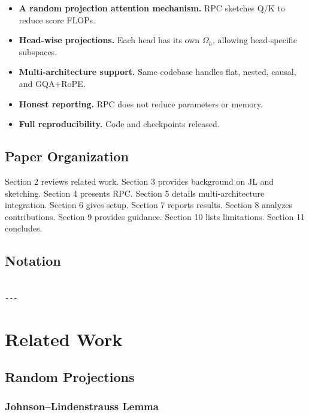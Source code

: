 \begin{itemize}
\item \textbf{A random projection attention mechanism.} RPC sketches Q/K to reduce
  score FLOPs.
\item \textbf{Head-wise projections.} Each head has its own $\Omega_h$, allowing
  head-specific subspaces.
\item \textbf{Multi-architecture support.} Same codebase handles flat, nested,
  causal, and GQA+RoPE.
\item \textbf{Honest reporting.} RPC does not reduce parameters or memory.
\item \textbf{Full reproducibility.} Code and checkpoints released.

\end{itemize}
\subsection{Paper Organization}

Section 2 reviews related work. Section 3 provides background on JL and 
sketching. Section 4 presents RPC. Section 5 details multi-architecture 
integration. Section 6 gives setup. Section 7 reports results. Section 8 
analyzes contributions. Section 9 provides guidance. Section 10 lists 
limitations. Section 11 concludes.



\subsection{Notation}

\begin{lstlisting}

---
\end{lstlisting}


\section{Related Work}

\subsection{Random Projections}

\subsubsection{Johnson--Lindenstrauss Lemma}

